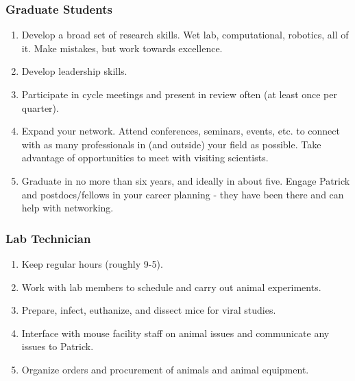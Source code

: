 \documentclass[10pt, letterpaper, twocolumn]{article} %
\begin{document}
\subsubsection{Graduate Students}
\begin{enumerate}
\item Develop a broad set of research skills. Wet lab, computational, robotics, all of it. Make mistakes, but work towards excellence.
\item Develop leadership skills.
\item Participate in cycle meetings and present in review often (at least once per quarter).
\item Expand your network. Attend conferences, seminars, events, etc. to connect with as many professionals in (and outside) your field as possible. Take advantage of opportunities to meet with visiting scientists.
\item Graduate in no more than six years, and ideally in about five. Engage Patrick and postdocs/fellows in your career planning - they have been there and can help with networking.
\end{enumerate}
\subsubsection{Lab Technician}
\begin{enumerate}
\item Keep regular hours (roughly 9-5).
\item Work with lab members to schedule and carry out animal experiments.
\item Prepare, infect, euthanize, and dissect mice for viral studies.
\item Interface with mouse facility staff on animal issues and communicate any issues to Patrick.
\item Organize orders and procurement of animals and animal equipment.
\end{enumerate}
\end{document}
